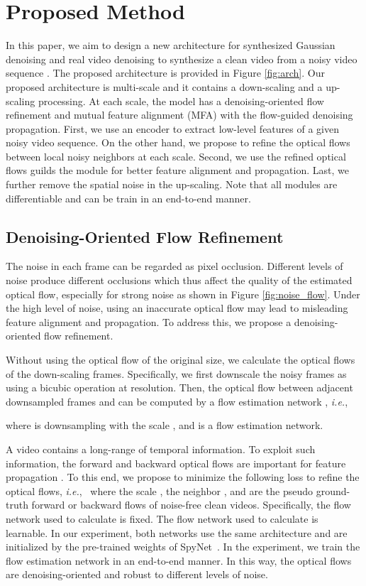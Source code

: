 \documentclass[10pt,twocolumn,letterpaper]{article}
\def\ie{\mbox{\textit{i.e.}, }}
\newlength \g
\begin{document}
\section{Proposed Method}
In this paper, we aim to design a new architecture for synthesized Gaussian denoising and real video denoising to synthesize a clean video from a noisy video sequence .
The proposed architecture is provided in Figure \ref{fig:arch}.
Our proposed architecture is multi-scale and it contains a down-scaling and a up-scaling processing.
At each scale, the model has a denoising-oriented flow refinement and mutual feature alignment (MFA) with the flow-guided denoising propagation.
First, we use an encoder to extract low-level features of a given noisy video sequence. 
On the other hand, we propose to refine the optical flows between local noisy neighbors at each scale.
Second, we use the refined optical flows guilds the module for better feature alignment and propagation.
Last, we further remove the spatial noise in the up-scaling.
Note that all modules are differentiable and can be train in an end-to-end manner.


\subsection{Denoising-Oriented Flow Refinement}
The noise in each frame can be regarded as pixel occlusion.
Different levels of noise produce different occlusions which thus affect the quality of the estimated optical flow, especially for strong noise as shown in Figure \ref{fig:noise_flow}.
Under the high level of noise, using an inaccurate optical flow may lead to misleading feature alignment and propagation.
To address this, we propose a denoising-oriented flow refinement. 

Without using the optical flow of the original size, we calculate the optical flows of the down-scaling frames.
Specifically, we first downscale the noisy frames as  using a bicubic operation at  resolution.
Then, the optical flow between adjacent downsampled frames  and  can be computed by a flow estimation network , \ie

where  is downsampling with the scale , and  is a flow estimation network. 

A video contains a long-range of temporal information.
To exploit such information, the forward and backward optical flows are important for feature propagation \cite{chan2021basicvsrpp}.
To this end, we propose to minimize the following  loss to refine the optical flows, \ie
 where the scale , the neighbor , and  are the pseudo ground-truth forward or backward flows of noise-free clean videos. Specifically, the flow network  used to calculate  is fixed. The flow network  used to calculate  is learnable. In our experiment, both networks use the same architecture and are initialized by the pre-trained weights of SpyNet~\cite{ranjan2017optical}.
In the experiment, we train the flow estimation network in an end-to-end manner.
In this way, the optical flows are denoising-oriented and robust to different levels of noise.
\end{document}
